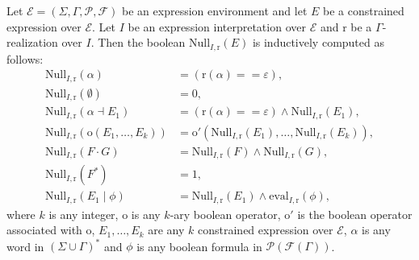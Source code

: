 \documentclass[a4paper]{llncs}
\begin{document}
  \begin{proposition}
    Let $\mathcal{E}=(\Sigma,\Gamma,\mathcal{P},\mathcal{F})$ be an expression environment and let $E$ be a constrained expression over $\mathcal{E}$. Let $I$ be  an expression interpretation over $\mathcal{E}$ and $\mathrm{r}$ be a $\Gamma$-realization over $I$. Then the boolean $\mathrm{Null}_{I,\mathrm{r}}(E)$ is inductively computed as follows:
        \begin{align*}
          \mathrm{Null}_{I,\mathrm{r}}(\alpha)&=(\mathrm{r}(\alpha)==\varepsilon),\\ 
      \mathrm{Null}_{I,\mathrm{r}}(\emptyset)&=0,\\
      \mathrm{Null}_{I,\mathrm{r}}(\alpha\dashv E_1)& =(\mathrm{r}(\alpha)==\varepsilon)\wedge \mathrm{Null}_{I,\mathrm{r}}(E_1),\\
      \mathrm{Null}_{I,\mathrm{r}}(\mathrm{o}(E_1,\ldots,E_k))&=\mathrm{o}'(\mathrm{Null}_{I,\mathrm{r}}(E_1),\ldots,\mathrm{Null}_{I,\mathrm{r}}(E_k)),\\
      \mathrm{Null}_{I,\mathrm{r}}(F\cdot G)&=\mathrm{Null}_{I,\mathrm{r}}(F)\wedge \mathrm{Null}_{I,\mathrm{r}}(G),\\
      \mathrm{Null}_{I,\mathrm{r}}(F^*)&=1,\\
      \mathrm{Null}_{I,\mathrm{r}}(E_1\mid \phi)&=\mathrm{Null}_{I,\mathrm{r}}(E_1)\wedge \mathrm{eval}_{I,\mathrm{r}}(\phi),
        \end{align*}
        where $k$ is any integer, $\mathrm{o}$ is any $k$-ary boolean operator, $\mathrm{o}'$ is the boolean operator associated with $\mathrm{o}$, $E_1,\ldots,E_k$ are any $k$ constrained expression over $\mathcal{E}$, $\alpha$ is any word in $(\Sigma\cup \Gamma)^*$ and $\phi$ is any boolean formula in $\mathcal{P}(\mathcal{F}(\Gamma))$.
  \end{proposition}
\end{document}

